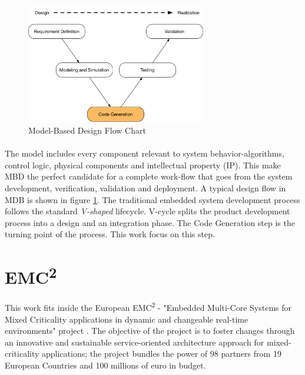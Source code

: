 \begin{figure}[htbp]
  \centering
  \includegraphics[width=0.7\textwidth]{MBDflowchart}
  \caption{Model-Based Design Flow Chart}
  \label{fig:mbdflowchart}
\end{figure}

\paragraph{} The model includes every component relevant to system behavior-algorithms, control logic, physical components and intellectual property (IP). This make MBD the perfect candidate for a complete work-flow that goes from the system development, verification, validation and deployment. A typical design flow in MDB is shown in figure \ref{fig:mbdflowchart}. The traditional embedded system development process follows the standard \emph{V-shaped} lifecycle. V-cycle splits the product development process into a design and an integration phase. The Code Generation step is the turning point of the process. This work focus on this step. 

\section{EMC\textsuperscript{2}}
This work fits inside the European EMC\textsuperscript{2} - "Embedded Multi-Core Systems for Mixed Criticality applications in dynamic and changeable real-time environments" project \cite{emc2artemis}. The objective of the project is to foster changes through an innovative and sustainable service-oriented architecture approach for mixed-criticality applications; the project bundles the power of 98 partners from 19 European Countries and 100 millions of euro in budget.

